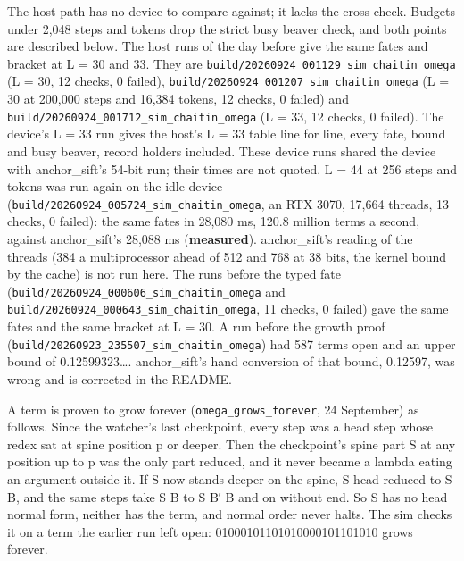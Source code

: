 The host path has no device to compare against; it lacks the cross-check. Budgets under 2,048 steps and tokens drop the strict busy beaver check, and both points are described below. The host runs of the day before give the same fates and bracket at L = 30 and 33. They are \texttt{build/\allowbreak{}20260924\_\allowbreak{}001129\_\allowbreak{}sim\_\allowbreak{}chaitin\_\allowbreak{}omega} (L = 30, 12 checks, 0 failed), \texttt{build/\allowbreak{}20260924\_\allowbreak{}001207\_\allowbreak{}sim\_\allowbreak{}chaitin\_\allowbreak{}omega} (L = 30 at 200,000 steps and 16,384 tokens, 12 checks, 0 failed) and \texttt{build/\allowbreak{}20260924\_\allowbreak{}001712\_\allowbreak{}sim\_\allowbreak{}chaitin\_\allowbreak{}omega} (L = 33, 12 checks, 0 failed). The device's L = 33 run gives the host's L = 33 table line for line, every fate, bound and busy beaver, record holders included. These device runs shared the device with anchor\_\allowbreak{}sift's 54-bit run; their times are not quoted. L = 44 at 256 steps and tokens was run again on the idle device (\texttt{build/\allowbreak{}20260924\_\allowbreak{}005724\_\allowbreak{}sim\_\allowbreak{}chaitin\_\allowbreak{}omega}, an RTX 3070, 17,664 threads, 13 checks, 0 failed): the same fates in 28,080 ms, 120.8 million terms a second, against anchor\_\allowbreak{}sift's 28,088 ms (\textbf{measured}). anchor\_\allowbreak{}sift's reading of the threads (384 a multiprocessor ahead of 512 and 768 at 38 bits, the kernel bound by the cache) is not run here. The runs before the typed fate (\texttt{build/\allowbreak{}20260924\_\allowbreak{}000606\_\allowbreak{}sim\_\allowbreak{}chaitin\_\allowbreak{}omega} and \texttt{build/\allowbreak{}20260924\_\allowbreak{}000643\_\allowbreak{}sim\_\allowbreak{}chaitin\_\allowbreak{}omega}, 11 checks, 0 failed) gave the same fates and the same bracket at L = 30. A run before the growth proof (\texttt{build/\allowbreak{}20260923\_\allowbreak{}235507\_\allowbreak{}sim\_\allowbreak{}chaitin\_\allowbreak{}omega}) had 587 terms open and an upper bound of 0.12599323…. anchor\_\allowbreak{}sift's hand conversion of that bound, 0.12597, was wrong and is corrected in the README.

A term is proven to grow forever (\texttt{omega\_\allowbreak{}grows\_\allowbreak{}forever}, 24 September) as follows. Since the watcher's last checkpoint, every step was a head step whose redex sat at spine position p or deeper. Then the checkpoint's spine part S at any position up to p was the only part reduced, and it never became a lambda eating an argument outside it. If S now stands deeper on the spine, S head-reduced to S B, and the same steps take S B to S B′ B and on without end. So S has no head normal form, neither has the term, and normal order never halts. The sim checks it on a term the earlier run left open: 01000101101010000101101010 grows forever.

